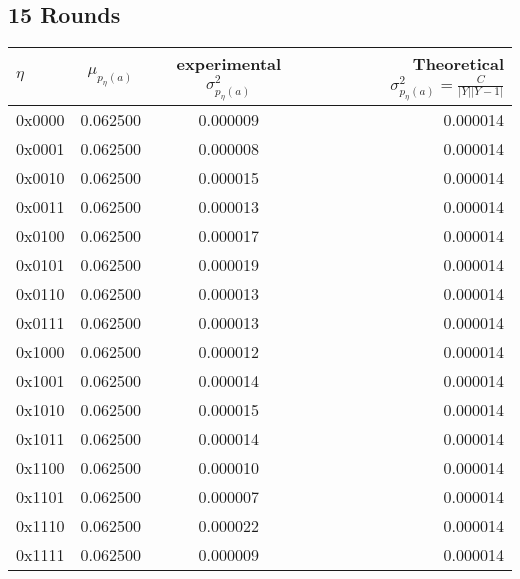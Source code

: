 \documentclass[9pt]{article}
\begin{document}
\subsection{15 Rounds}
\begin{tabular}{l*{2}{c}r}
$\eta$ & $\mu_{p_{\eta}(a)}$ & experimental $\sigma^2_{p_{\eta}(a)}$ & Theoretical $\sigma^2_{p_{\eta}(a)} = \frac{C}{|Y||Y-1|}$ \\
\hline
0x0000 & 0.062500 & 0.000009 & 0.000014 \\
0x0001 & 0.062500 & 0.000008 & 0.000014 \\
0x0010 & 0.062500 & 0.000015 & 0.000014 \\
0x0011 & 0.062500 & 0.000013 & 0.000014 \\
0x0100 & 0.062500 & 0.000017 & 0.000014 \\
0x0101 & 0.062500 & 0.000019 & 0.000014 \\
0x0110 & 0.062500 & 0.000013 & 0.000014 \\
0x0111 & 0.062500 & 0.000013 & 0.000014 \\
0x1000 & 0.062500 & 0.000012 & 0.000014 \\
0x1001 & 0.062500 & 0.000014 & 0.000014 \\
0x1010 & 0.062500 & 0.000015 & 0.000014 \\
0x1011 & 0.062500 & 0.000014 & 0.000014 \\
0x1100 & 0.062500 & 0.000010 & 0.000014 \\
0x1101 & 0.062500 & 0.000007 & 0.000014 \\
0x1110 & 0.062500 & 0.000022 & 0.000014 \\
0x1111 & 0.062500 & 0.000009 & 0.000014 \\
\end{tabular}
\end{document}
